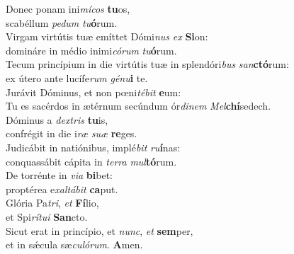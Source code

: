 \evenverse Donec ponam ini\textit{mí}\textit{cos} \textbf{tu}os,~\*\\
\evenverse scabéllum \textit{pe}\textit{dum} \textit{tu}\textbf{ó}rum.\\
\oddverse Virgam virtútis tuæ emíttet Dómi\textit{nus} \textit{ex} \textbf{Si}on:~\*\\
\oddverse domináre in médio inimi\textit{có}\textit{rum} \textit{tu}\textbf{ó}rum.\\
\evenverse Tecum princípium in die virtútis tuæ in splendóri\textit{bus} \textit{san}\textbf{ctó}rum:~\*\\
\evenverse ex útero ante lucífe\textit{rum} \textit{gé}\textit{nu}\textbf{i} te.\\
\oddverse Jurávit Dóminus, et non pœni\textit{té}\textit{bit} \textbf{e}um:~\*\\
\oddverse Tu es sacérdos in ætérnum secúndum ór\textit{di}\textit{nem} \textit{Mel}\textbf{chí}sedech.\\
\evenverse Dóminus a \textit{dex}\textit{tris} \textbf{tu}is,~\*\\
\evenverse confrégit in die i\textit{ræ} \textit{su}\textit{æ} \textbf{re}ges.\\
\oddverse Judicábit in natiónibus, implé\textit{bit} \textit{ru}\textbf{í}nas:~\*\\
\oddverse conquassábit cápita in \textit{ter}\textit{ra} \textit{mul}\textbf{tó}rum.\\
\evenverse De torrénte in \textit{vi}\textit{a} \textbf{bi}bet:~\*\\
\evenverse proptérea e\textit{xal}\textit{tá}\textit{bit} \textbf{ca}put.\\
\oddverse Glória Pa\textit{tri}, \textit{et} \textbf{Fí}lio,~\*\\
\oddverse et Spi\textit{rí}\textit{tu}\textit{i} \textbf{San}cto.\\
\evenverse Sicut erat in princípio, et \textit{nunc}, \textit{et} \textbf{sem}per,~\*\\
\evenverse et in sǽcula sæ\textit{cu}\textit{ló}\textit{rum}. \textbf{A}men.\\
